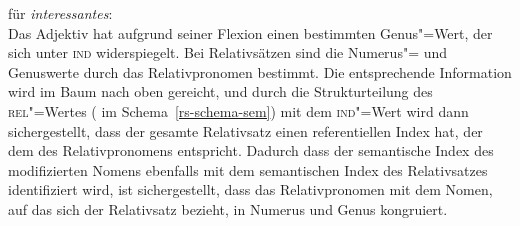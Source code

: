 \ea
\locw für \emph{interessantes}:\\
\label{le-interessantes-zwei}%
\z
Das Adjektiv hat aufgrund seiner Flexion einen bestimmten Genus"=Wert, der sich unter
\textsc{ind} widerspiegelt. Bei Relativsätzen sind die Numerus"= und Genuswerte durch das Relativpronomen
bestimmt. Die entsprechende Information wird im Baum nach oben gereicht, und durch die Strukturteilung
des \textsc{rel}"=Wertes ( im Schema~\ref{rs-schema-sem}) mit dem \textsc{ind}"=Wert wird dann sichergestellt, dass der gesamte Relativsatz
einen referentiellen Index hat, der dem des Relativpronomens entspricht. Dadurch dass der semantische
Index des modifizierten Nomens ebenfalls mit dem semantischen Index des Relativsatzes identifiziert wird,
ist sichergestellt, dass das Relativpronomen mit dem Nomen, auf das sich der Relativsatz bezieht, in
Numerus und Genus kongruiert.

